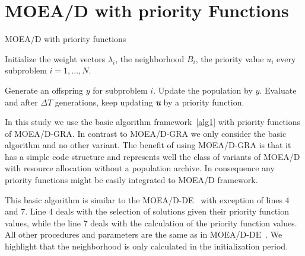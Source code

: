 \section{MOEA/D with priority Functions}



\begin{algorithm}[h]
	\caption{MOEA/D with priority functions}\label{alg1}
	\begin{algorithmic}[1]
		
		\State Initialize the weight vectors $\lambda_i$, the neighborhood $B_i$, the priority value $u_i$ every subproblem $i=1,...,N$.
		
		\State Generate an offspring $y$ for subproblem $i$.
		\State Update the population by $y$.
		\EndIf
		\EndFor
		\State  Evaluate and after $\Delta T$ generations, keep updating \textit{\textbf{u}} by a priority function.
		\EndWhile
	\end{algorithmic}
\end{algorithm}

In this study we use the basic algorithm framework~\ref{alg1} with priority functions of MOEA/D-GRA. In contrast to MOEA/D-GRA we only consider the basic algorithm and no other variant. The benefit of using MOEA/D-GRA is that it has a simple code structure and represents well the class of variants of MOEA/D with resource allocation without a population archive. In consequence any priority functions might be easily integrated to MOEA/D framework. 

This basic algorithm is similar to the MOEA/D-DE~\cite{zhang2009performance} with exception of lines 4 and 7. Line 4 deals with the selection of solutions given their priority function values, while the line 7 deals with the calculation of the priority function values. All other procedures and parameters are the same as in MOEA/D-DE~\cite{li2009multiobjective}. We highlight that the neighborhood is only calculated in the initialization period.



